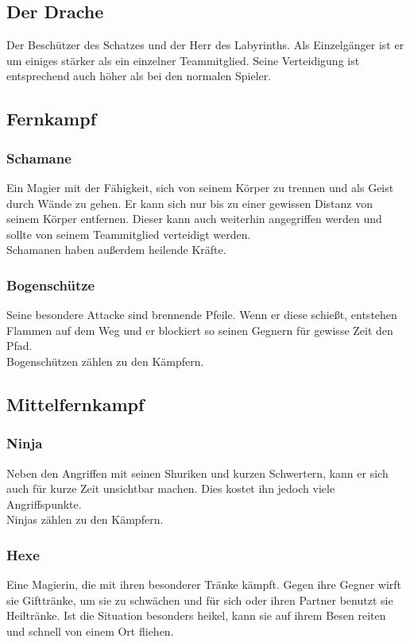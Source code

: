 \documentclass[10pt,a4paper,notitlepage]{report}
\begin{document}
\begin{flushleft}
\subsection{Der Drache} 
Der Beschützer des Schatzes und der Herr des Labyrinths. Als Einzelgänger ist er um einiges stärker als ein einzelner Teammitglied. Seine Verteidigung ist entsprechend auch höher als bei den normalen Spieler. \\
\subsection{Fernkampf}
\subsubsection{Schamane}
Ein Magier mit der Fähigkeit, sich von seinem Körper zu trennen und als Geist durch Wände zu gehen. Er kann sich nur bis zu einer gewissen Distanz von seinem Körper entfernen. Dieser kann auch weiterhin angegriffen werden und sollte von seinem Teammitglied verteidigt werden.\\
Schamanen haben außerdem heilende Kräfte.\\
\subsubsection{Bogenschütze}
Seine besondere Attacke sind brennende Pfeile. Wenn er diese schießt, entstehen Flammen auf dem Weg und er blockiert so seinen Gegnern für gewisse Zeit den Pfad.\\
Bogenschützen zählen zu den Kämpfern.\\
\subsection{Mittelfernkampf}
\subsubsection{Ninja}
Neben den Angriffen mit seinen Shuriken und kurzen Schwertern, kann er sich auch für kurze Zeit unsichtbar machen. Dies kostet ihn jedoch viele Angriffspunkte.\\
Ninjas zählen zu den Kämpfern.\\
\subsubsection{Hexe}
Eine Magierin, die mit ihren besonderer Tränke kämpft. Gegen ihre Gegner wirft sie Gifttränke, um sie zu schwächen und für sich oder ihren Partner benutzt sie Heiltränke. Ist die Situation besonders heikel, kann sie auf ihrem Besen reiten und schnell von einem Ort fliehen.\\

\end{flushleft}
\end{document}
